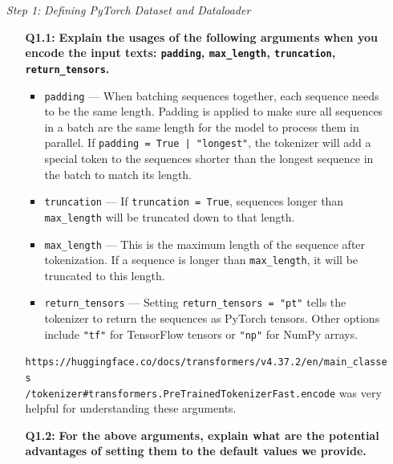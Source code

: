 \documentclass{article}
\begin{document}
\begin{itemize}
    \item[\textit{Step 1:}] \textit{Defining PyTorch Dataset and Dataloader}
    
    \begin{itemize}
        \item[\textbf{Q1.1:}] \textbf{Explain the usages of the following
        arguments when you encode the input texts: \texttt{padding},
        \texttt{max\_length}, \texttt{truncation}, \texttt{return\_tensors}.}
        
        \begin{itemize}
            \item \texttt{padding} --- When batching sequences together, each
            sequence needs to be the same length. Padding is applied to make
            sure all sequences in a batch are the same length for the model to
            process them in parallel. If \texttt{padding = True | "longest"},
            the tokenizer will add a special token to the sequences shorter than
            the longest sequence in the batch to match its length.

            \item \texttt{truncation} --- If \texttt{truncation = True},
            sequences longer than \texttt{max\_length} will be truncated down to
            that length. 

            \item \texttt{max\_length} --- This is the maximum length of the
            sequence after tokenization. If a sequence is longer than
            \texttt{max\_length}, it will be truncated to this length.

            \item \texttt{return\_tensors} --- Setting \texttt{return\_tensors =
            "pt"} tells the tokenizer to return the sequences as PyTorch
            tensors. Other options include \texttt{"tf"} for TensorFlow tensors
            or \texttt{"np"} for NumPy arrays.
        \end{itemize}

        \texttt{https://huggingface.co/docs/transformers/v4.37.2/en/main\_classes\\
        /tokenizer\#transformers.PreTrainedTokenizerFast.encode} was very
        helpful for understanding these arguments.

        \item[\textbf{Q1.2:}] \textbf{For the above arguments, explain what are
        the potential advantages of setting them to the default values we
        provide.}


\end{itemize}
\end{itemize}
\end{document}
